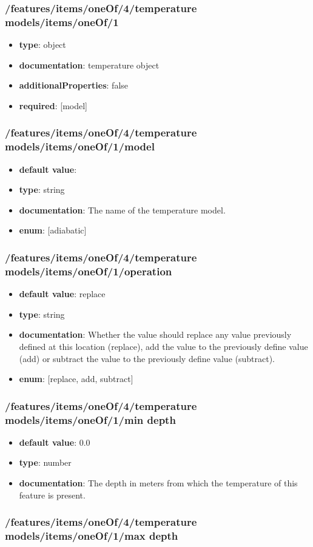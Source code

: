 \subsubsection{/features/items/oneOf/4/temperature models/items/oneOf/1}
\begin{itemize}\item {\bf type}: object
\item {\bf documentation}: temperature object
\item {\bf additionalProperties}: false
\item {\bf required}: [model]\end{itemize}
\subsubsection{/features/items/oneOf/4/temperature models/items/oneOf/1/model}
\begin{itemize}\item {\bf default value}: 
\item {\bf type}: string
\item {\bf documentation}: The name of the temperature model.
\item {\bf enum}: [adiabatic]\end{itemize}\subsubsection{/features/items/oneOf/4/temperature models/items/oneOf/1/operation}
\begin{itemize}\item {\bf default value}: replace
\item {\bf type}: string
\item {\bf documentation}: Whether the value should replace any value previously defined at this location (replace), add the value to the previously define value (add) or subtract the value to the previously define value (subtract).
\item {\bf enum}: [replace, add, subtract]\end{itemize}\subsubsection{/features/items/oneOf/4/temperature models/items/oneOf/1/min depth}
\begin{itemize}\item {\bf default value}: 0.0
\item {\bf type}: number
\item {\bf documentation}: The depth in meters from which the temperature of this feature is present.
\end{itemize}\subsubsection{/features/items/oneOf/4/temperature models/items/oneOf/1/max depth}
